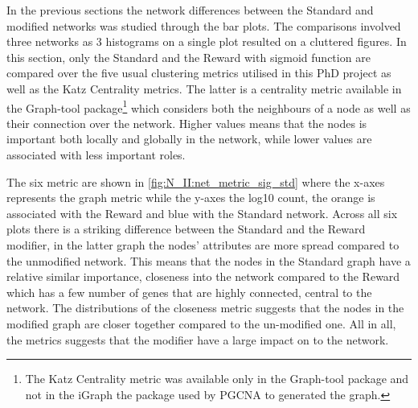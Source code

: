 In the previous sections the network differences between the Standard and modified networks was studied through the bar plots. The comparisons involved three networks as 3 histograms on a single plot resulted on a cluttered figures. In this section, only the Standard and the Reward with sigmoid function are compared over the five usual clustering metrics utilised in this PhD project as well as the Katz Centrality metrics. The latter is a centrality metric available in the Graph-tool package\footnote{The Katz Centrality metric was available only in the Graph-tool package and not in the iGraph the package used by PGCNA to generated the graph.} which considers both the neighbours of a node as well as their connection over the network. Higher values means that the nodes is important both locally and globally in the network, while lower values are associated with less important roles. 

The six metric are shown in \cref{fig:N_II:net_metric_sig_std} where the x-axes represents the graph metric while the y-axes the log10 count, the orange is associated with the Reward and blue with the Standard network. Across all six plots there is a striking difference between the Standard and the Reward modifier,  in the latter graph the nodes' attributes are more spread compared to the unmodified network. This means that the nodes in the Standard graph have a relative similar importance, closeness into the network compared to the Reward which has a few number of genes that are highly connected, central to the network.
The distributions of the closeness metric suggests that the nodes in the modified graph are closer together compared to the un-modified one. All in all, the metrics suggests that the modifier have a large impact on to the network.


